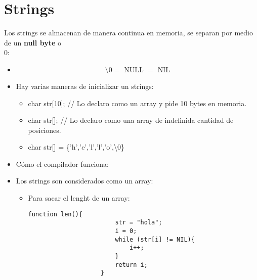 \section{Strings}
Los strings se almacenan de manera continua en memoria, se separan por medio de un \textbf{null byte} o \\0:
\begin{itemize}
    \item \[
        \text{  \textbackslash  }0 = \text{  NULL  } = \text{  NIL  }
    \]
    
    \item Hay varias maneras de inicializar un strings:
        \begin{itemize}
            \item char str[10]; // Lo declaro como un array y pide 10 bytes en memoria.
            \item char str[]; // Lo declaro como una array de indefinida cantidad de posiciones.
            \item char str[] = \{'h','e','l','l','o',\textbackslash0\}
        \end{itemize}
    
    \item Cómo el compilador funciona: 
        \newline 
    
    \item Los strings son considerados como un array:
        \begin{itemize}
            \item Para sacar el lenght de un array:
                \begin{Verbatim}[breaklines=true, breakanywhere=true]
                    function len(){
                        str = "hola";
                        i = 0; 
                        while (str[i] != NIL){
                            i++; 
                        }
                        return i;
                    }
                \end{Verbatim}
            

\end{itemize}
\end{itemize}
